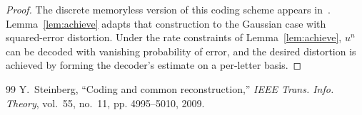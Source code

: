\documentclass[10pt,a4paper]{amsart}
\begin{document}
\begin{proof}
The discrete memoryless version of this coding scheme appears in~\cite[Theorem~2]{steinberg2009coding}. Lemma~\ref{lem:achieve} adapts that construction to the Gaussian case with squared-error distortion. Under the rate constraints of Lemma~\ref{lem:achieve}, $u^n$ can be decoded with vanishing probability of error, and the desired distortion is achieved by forming the decoder’s estimate on a per-letter basis.  
\end{proof}

\begin{thebibliography}{99}
 Y.~Steinberg, ``Coding and common reconstruction,'' \emph{IEEE Trans. Info. Theory}, vol.~55, no.~11, pp. 4995--5010, 2009.
\end{thebibliography}
\end{document}
